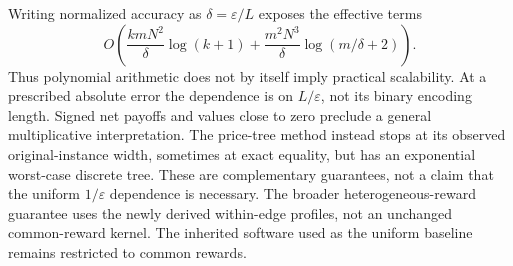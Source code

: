 Writing normalized accuracy as $\delta=\varepsilon/L$ exposes the effective terms
\[
 O\left(\frac{kmN^2}{\delta}\log(k+1)
       +\frac{m^2N^3}{\delta}\log(m/\delta+2)\right).
\]
Thus polynomial arithmetic does not by itself imply practical scalability. At a prescribed absolute error the dependence is on $L/\varepsilon$, not its binary encoding length. Signed net payoffs and values close to zero preclude a general multiplicative interpretation. The price-tree method instead stops at its observed original-instance width, sometimes at exact equality, but has an exponential worst-case discrete tree. These are complementary guarantees, not a claim that the uniform $1/\varepsilon$ dependence is necessary. The broader heterogeneous-reward guarantee uses the newly derived within-edge profiles, not an unchanged common-reward kernel. The inherited software used as the uniform baseline remains restricted to common rewards.
